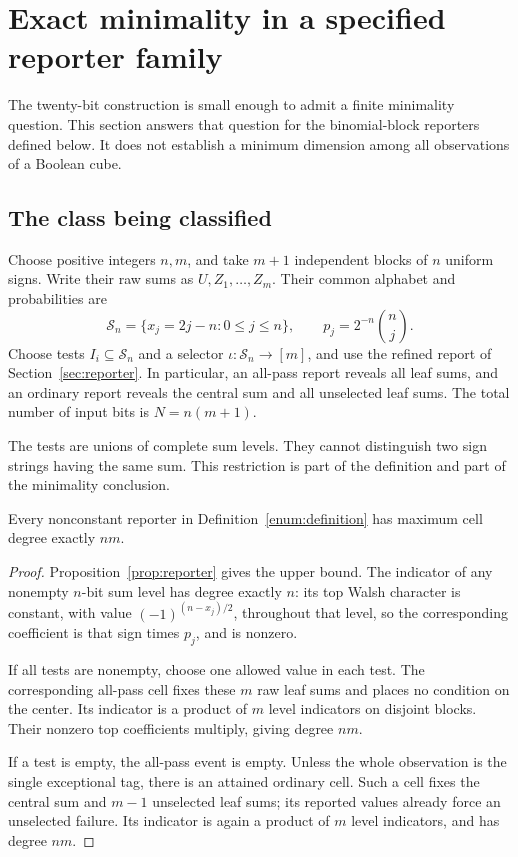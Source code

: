 \section{Exact minimality in a specified reporter family}
\label{enum:section}

The twenty-bit construction is small enough to admit a finite
minimality question. This section answers that question for the
binomial-block reporters defined below. It does not establish a
minimum dimension among all observations of a Boolean cube.

\subsection{The class being classified}

\begin{definition}\label{enum:definition}
Choose positive integers \(n,m\), and take \(m+1\) independent blocks
of \(n\) uniform signs. Write their raw sums as
\(U,Z_1,\ldots,Z_m\). Their common alphabet and probabilities are
\[
 \mathcal S_n=\{x_j=2j-n:0\le j\le n\},\qquad
 p_j=2^{-n}\binom nj.
\]
Choose tests \(I_i\subseteq\mathcal S_n\) and a selector
\(\iota:\mathcal S_n\to[m]\), and use the refined report of
Section~\ref{sec:reporter}. In particular, an all-pass report reveals
all leaf sums, and an ordinary report reveals the central sum and all
unselected leaf sums. The total number of input bits is
\(N=n(m+1)\).
\end{definition}

The tests are unions of complete sum levels. They cannot distinguish
two sign strings having the same sum. This restriction is part of the
definition and part of the minimality conclusion.

\begin{lemma}
\label{enum:exact-degree}
Every nonconstant reporter in Definition~\ref{enum:definition} has
maximum cell degree exactly \(nm\).
\end{lemma}

\begin{proof}
Proposition~\ref{prop:reporter} gives the upper bound. The indicator
of any nonempty \(n\)-bit sum level has degree exactly \(n\): its
top Walsh character is constant, with value
\((-1)^{(n-x_j)/2}\), throughout that level, so the corresponding
coefficient is that sign times \(p_j\), and is nonzero.

If all tests are nonempty, choose one allowed value in each test.
The corresponding all-pass cell fixes these \(m\) raw leaf sums and
places no condition on the center. Its indicator is a product of
\(m\) level indicators on disjoint blocks. Their nonzero top
coefficients multiply, giving degree \(nm\).

If a test is empty, the all-pass event is empty. Unless the whole
observation is the single exceptional tag, there is an attained
ordinary cell. Such a cell fixes the central sum and \(m-1\)
unselected leaf sums; its reported values already force an unselected
failure. Its indicator is again a product of \(m\) level indicators,
and has degree \(nm\).
\end{proof}

